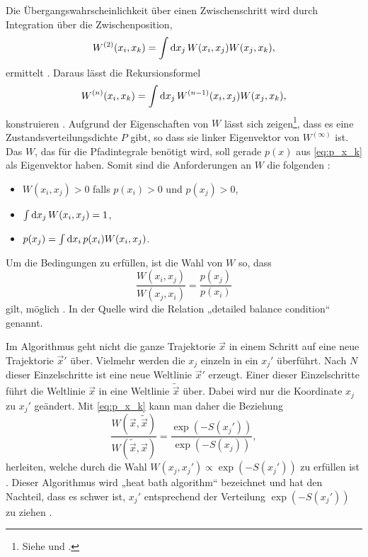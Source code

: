 
Die Übergangswahrscheinlichkeit über einen Zwischenschritt wird durch
Integration über die Zwischenposition,
\[
    W^{(2)}(x_i, x_k) = \int \dif x_j \, W(x_i, x_j) W(x_j, x_k),
\]
ermittelt \parencite[(3.9)]{Creutz/Statistical_Approach_QM}. Daraus lässt die
Rekursionsformel
\[
    W^{(n)}(x_i, x_k) = \int \dif x_j \, W^{(n-1)}(x_i, x_j) W(x_j, x_k),
\]
konstruieren \parencite[(3.10)]{Creutz/Statistical_Approach_QM}. Aufgrund der
Eigenschaften von $W$ lässt sich zeigen\footnote{Siehe
    \parencite[435]{Creutz/Statistical_Approach_QM} und
\parencite[Anhang~B]{Creutz/Statistical_Approach_QM}.}, dass es eine
Zustandsverteilungsdichte $P$ gibt, so dass sie linker Eigenvektor von
$W^{(\infty)}$ ist. Das $W$, das für die Pfadintegrale benötigt wird, soll gerade
$p(x)$ aus \eqref{eq:p_x_k} als Eigenvektor haben. Somit sind die
Anforderungen an $W$ die folgenden \parencite[(3.18)]{Creutz/Statistical_Approach_QM}:
\begin{itemize}
    \item
        $W(x_i, x_j) > 0$ falls $p(x_i) > 0$ und $p(x_j) > 0$,
    \item
        $\int \dif x_j \, W(x_i, x_j) = 1$,
    \item
        $p(x_j) = \int \dif x_i \, p(x_i) W(x_i, x_j)$.
\end{itemize}


Um die Bedingungen zu erfüllen, ist die Wahl von $W$ so, dass
\[
    \frac{W(x_i, x_j)}{W(x_j, x_i)} = \frac{p(x_j)}{p(x_i)}
\]
gilt, möglich \parencite[(3.23)]{Creutz/Statistical_Approach_QM}. In der Quelle
wird die Relation „detailed balance condition“ genannt.

Im Algorithmus geht nicht die ganze Trajektorie $\vec x$ in einem Schritt auf
eine neue Trajektorie $\vec x'$ über. Vielmehr werden die $x_j$ einzeln in ein
$x_j'$ überführt. Nach $N$ dieser Einzelschritte ist eine neue Weltlinie $\vec
x'$ erzeugt. Einer dieser Einzelschritte führt die Weltlinie $\vec x$ in eine
Weltlinie $\tilde{\vec x}$ über. Dabei wird nur die Koordinate $x_j$ zu $x_j'$
geändert. Mit \eqref{eq:p_x_k} kann man daher die Beziehung
\parencite[(3.25)]{Creutz/Statistical_Approach_QM}
\[
    \frac{W(\vec x, \tilde{\vec x})}{W(\tilde{\vec x}, \vec x)}
    = \frac{\exp(-S(x_j'))}{\exp(-S(x_j))},
\]
herleiten, welche durch die Wahl $W(x_j, x_j') \propto \exp(-S(x_j'))$ zu
erfüllen ist \parencite[(3.27)]{Creutz/Statistical_Approach_QM}. Dieser
Algorithmus wird „heat bath algorithm“ bezeichnet und hat den Nachteil, dass
es schwer ist, $x_j'$ entsprechend der Verteilung $\exp(-S(x_j'))$ zu ziehen
\parencite[438]{Creutz/Statistical_Approach_QM}.

